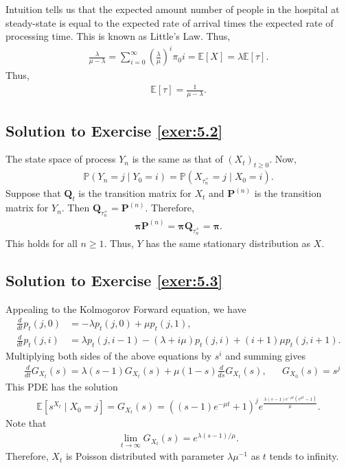 \documentclass[12pt]{book}
\numberwithin{equation}{chapter}
\theoremstyle{plain}
\numberwithin{theorem}{section}
\theoremstyle{definition}
\numberwithin{exercise}{chapter}
\newcommand{\<}{\langle}
\renewcommand{\>}{\rangle}
\renewcommand{\(}{\left(}
\renewcommand{\)}{\right)}
\renewcommand{\[}{\left[}
\renewcommand{\]}{\right]}
\newcommand\Eb{\mathds{E}}
\newcommand\Pb{\mathds{P}}
\newcommand\Pv{\pmb{P}}
\newcommand\Qv{\pmb{Q}}
\newcommand\piv{\pmb{\pi}}
\begin{document}
Intuition tells us that the expected amount number of people in the hospital at steady-state is equal to the expected 
rate of arrival times the expected rate of processing time. This is known as Little's Law. Thus, 
\begin{align}
\frac{\lambda }{\mu - \lambda}
	= \sum_{i=0}^\infty \( \frac{\lambda}{\mu}\)^i \pi_0 i
	= \Eb[ X]
	= \lambda \Eb[\tau].
\end{align}
Thus, 
\begin{align}
\Eb[\tau]
	= \frac{1}{\mu - \lambda}.
\end{align}

\subsection*{Solution to Exercise \ref{exer:5.2}}
The state space of process $Y_n$ is the same as that of $(X_t)_{t\geq 0}$. Now,
\begin{align}
\Pb( Y_{n} = j \mid Y_0 = i)
	= \Pb( X_{\tau_{n}^+} = j \mid X_{0} = i ).
\end{align}
Suppose that $\Qv_t$ is the transition matrix for $X_t$ and $\Pv^{(n)}$ is the transition matrix for $Y_n$. Then 
$\Qv_{\tau_n^+} = \Pv^{(n)}$. Therefore, 
\begin{align}
\piv \Pv^{(n)}
	= \piv \Qv_{\tau_n^+}
	= \piv. 
\end{align}
This holds for all $n \geq 1$. Thus, $Y$ has the same stationary distribution as $X$.

\subsection*{Solution to Exercise \ref{exer:5.3}}
Appealing to the Kolmogorov Forward equation, we have
\begin{align}
\frac{d}{dt} p_t (j,0)
	&= -\lambda p_t(j,0) + \mu p_t(j,1), \\
\frac{d}{dt} p_t(j,i)
	&= \lambda p_t(j,i-1) - (\lambda + i \mu) p_t(j,i) + (i+1) \mu p_t(j,i+1).
\end{align}
Multiplying both sides of the above equations by $s^i$ and summing gives
\begin{align}
&\frac{d}{dt} G_{X_t}(s)
	= \lambda (s - 1) G_{X_t} (s) + \mu( 1 - s) \frac{d}{ds} G_{X_t}(s),
&& G_{X_0}(s) = s^j	
\end{align}
This PDE has the solution
\begin{align}
\Eb[ s^{X_t}  \mid X_0 = j]
	= G_{X_t}(s) 
	= \left((s-1) e^{- \mu t }+1\right)^j e^{\frac{\lambda  (s-1) e^{- \mu t} \left(e^{\mu  t}-1\right)}{\mu }}.
\end{align}
Note that 
\begin{align}
\lim_{t\to\infty} G_{X_t}(s) 
	= e^{\lambda( s- 1) / \mu}.
\end{align}
Therefore, $X_t$ is Poisson distributed with parameter $\lambda \mu^{-1}$ as $t$ tends to infinity. 
\end{document}
